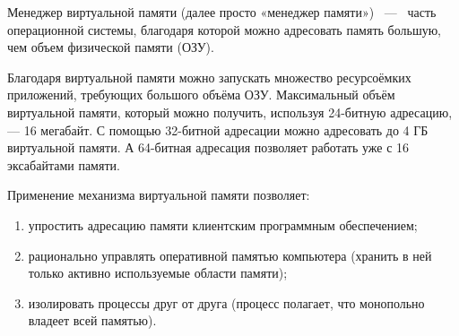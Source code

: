 Менеджер виртуальной памяти (далее просто «менеджер памяти») ~---~ часть операционной системы, благодаря которой можно адресовать память большую, чем объем физической памяти (ОЗУ).

Благодаря виртуальной памяти можно запускать множество ресурсоёмких приложений, требующих большого объёма ОЗУ. Максимальный объём виртуальной памяти, который можно получить, используя 24-битную адресацию, — 16 мегабайт. С помощью 32-битной адресации можно адресовать до 4 ГБ виртуальной памяти. А 64-битная адресация позволяет работать уже с 16 эксабайтами памяти.

Применение механизма виртуальной памяти позволяет:

\begin{enumerate}
	\item упростить адресацию памяти клиентским программным обеспечением;
	\item рационально управлять оперативной памятью компьютера (хранить в ней только активно используемые области памяти);
	\item изолировать процессы друг от друга (процесс полагает, что монопольно владеет всей памятью).
\end{enumerate}